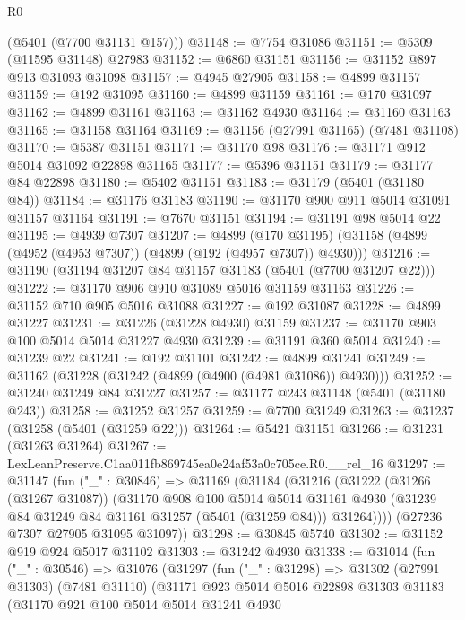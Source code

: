 \begin{lexlean}{R0}
\begin{coremodule}
      (@5401 (@7700 @31131 @157)))
@31148 := @7754 @31086
@31151 := @5309 (@11595 @31148) @27983
@31152 := @6860 @31151
@31156 := @31152 @897 @913 @31093 @31098
@31157 := @4945 @27905
@31158 := @4899 @31157
@31159 := @192 @31095
@31160 := @4899 @31159
@31161 := @170 @31097
@31162 := @4899 @31161
@31163 := @31162 @4930
@31164 := @31160 @31163
@31165 := @31158 @31164
@31169 := @31156 (@27991 @31165) (@7481 @31108)
@31170 := @5387 @31151
@31171 := @31170 @98
@31176 := @31171 @912 @5014 @31092 @22898 @31165
@31177 := @5396 @31151
@31179 := @31177 @84 @22898
@31180 := @5402 @31151
@31183 := @31179 (@5401 (@31180 @84))
@31184 := @31176 @31183
@31190 := @31170 @900 @911 @5014 @31091 @31157 @31164
@31191 := @7670 @31151
@31194 := @31191 @98 @5014 @22
@31195 := @4939 @7307
@31207 := @4899
    (@170 @31195)
    (@31158 (@4899 (@4952 (@4953 @7307)) (@4899 (@192 (@4957 @7307)) @4930)))
@31216 := @31190 (@31194 @31207 @84 @31157 @31183 (@5401 (@7700 @31207 @22)))
@31222 := @31170 @906 @910 @31089 @5016 @31159 @31163
@31226 := @31152 @710 @905 @5016 @31088
@31227 := @192 @31087
@31228 := @4899 @31227
@31231 := @31226 (@31228 @4930) @31159
@31237 := @31170 @903 @100 @5014 @5014 @31227 @4930
@31239 := @31191 @360 @5014
@31240 := @31239 @22
@31241 := @192 @31101
@31242 := @4899 @31241
@31249 := @31162 (@31228 (@31242 (@4899 (@4900 (@4981 @31086)) @4930)))
@31252 := @31240 @31249 @84 @31227
@31257 := @31177 @243 @31148 (@5401 (@31180 @243))
@31258 := @31252 @31257
@31259 := @7700 @31249
@31263 := @31237 (@31258 (@5401 (@31259 @22)))
@31264 := @5421 @31151
@31266 := @31231 (@31263 @31264)
@31267 := LexLeanPreserve.C1aa011fb869745ea0e24af53a0c705ce.R0.__rel_16
@31297 := @31147
    (fun ("_" : @30846) =>
    @31169
      (@31184
        (@31216
          (@31222
            (@31266 (@31267 @31087))
            (@31170
              @908
              @100
              @5014
              @5014
              @31161
              @4930
              (@31239 @84 @31249 @84 @31161 @31257 (@5401 (@31259 @84)))
              @31264))))
      (@27236 @7307 @27905 @31095 @31097))
@31298 := @30845 @5740
@31302 := @31152 @919 @924 @5017 @31102
@31303 := @31242 @4930
@31338 := @31014
    (fun ("_" : @30546) =>
    @31076
      (@31297
        (fun ("_" : @31298) =>
        @31302
          (@27991 @31303)
          (@7481 @31110)
          (@31171
            @923
            @5014
            @5016
            @22898
            @31303
            @31183
            (@31170
              @921
              @100
              @5014
              @5014
              @31241
              @4930

\end{coremodule}
\end{lexlean}
